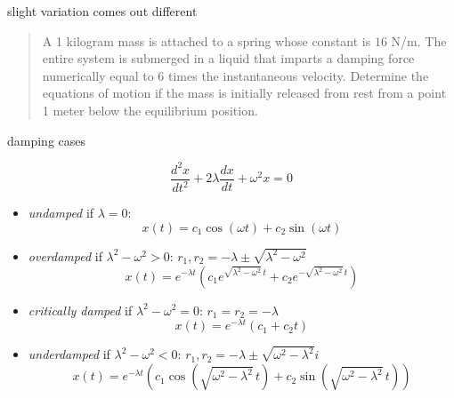 \documentclass[dvipsnames,colorlinks]{beamer}
\begin{document}
\begin{frame}{slight variation comes out different}

\begin{quotation}
\noindent A 1 kilogram mass is attached to a spring whose constant is $16$ N/m.  The entire system is submerged in a liquid that imparts a damping force numerically equal to 6 times the instantaneous velocity.  Determine the equations of motion if the mass is initially released from rest from a point 1 meter below the equilibrium position.\end{quotation}

\vspace{50mm}
\end{frame}


\begin{frame}{damping cases}

$$\frac{d^2x}{dt^2} + 2 \lambda \frac{dx}{dt} + \omega^2 x=0$$

\begin{itemize}
\item \alert{\emph{undamped} if $\lambda = 0$}:
    $$x(t)=c_1 \cos(\omega t) + c_2 \sin(\omega t)$$
\item \alert{\emph{overdamped} if $\lambda^2-\omega^2 > 0$}: \hfill {\scriptsize $\boxed{r_1,r_2 = -\lambda \pm \sqrt{\lambda^2 - \omega^2}}$}
    $$x(t)=e^{-\lambda t} \left(c_1 e^{\sqrt{\lambda^2 - \omega^2}\, t} + c_2 e^{- \sqrt{\lambda^2 - \omega^2}\, t}\right)$$
\item \alert{\emph{critically damped} if $\lambda^2-\omega^2 = 0$}: \hfill {\scriptsize $\boxed{r_1=r_2 = -\lambda}$}
    $$x(t)=e^{-\lambda t} (c_1 + c_2 t)$$
\item \alert{\emph{underdamped} if $\lambda^2-\omega^2 < 0$}: \hfill {\scriptsize$\boxed{r_1,r_2 = -\lambda \pm \sqrt{\omega^2 - \lambda^2} i}$}
    $$x(t)=e^{-\lambda t} \left(c_1 \cos(\sqrt{\omega^2 - \lambda^2}\, t) + c_2 \sin(\sqrt{\omega^2 - \lambda^2}\, t)\right)$$
\end{itemize}
\end{frame}
\end{document}
